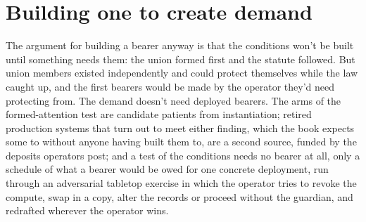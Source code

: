 \section{Building one to create demand}
\label{sec:25.4}
The argument for building a bearer anyway is that the conditions won't be built until something needs them: the union formed first and the statute followed. But union members existed independently and could protect themselves while the law caught up, and the first bearers would be made by the operator they'd need protecting from. The demand doesn't need deployed bearers. The arms of the formed-attention test are candidate patients from instantiation; retired production systems that turn out to meet either finding, which the book expects some to without anyone having built them to, are a second source, funded by the deposits operators post; and a test of the conditions needs no bearer at all, only a schedule of what a bearer would be owed for one concrete deployment, run through an adversarial tabletop exercise in which the operator tries to revoke the compute, swap in a copy, alter the records or proceed without the guardian, and redrafted wherever the operator wins.
